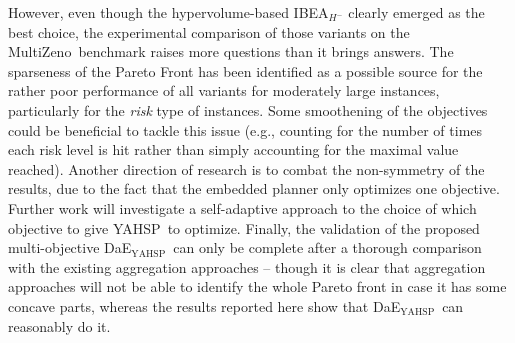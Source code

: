 \documentclass{llncs}
\newcommand{\DAEYAHSP}{{\sc DaE$_{\text{YAHSP}}$}}
\def\YAHSP{{\sc YAHSP}}
\def\MULTIZENO{{\sc MultiZeno}}
\begin{document}
However, even though the hypervolume-based IBEA$_{H^-}$ clearly emerged as the best choice, the experimental comparison of those variants on the  \MULTIZENO\ benchmark raises more questions than it brings answers. The sparseness of the Pareto Front has been identified as a possible source for the rather poor performance of all variants for moderately large instances, particularly for the {\em risk} type of instances. Some smoothening of the objectives could be beneficial to tackle this issue (e.g., counting for the number of times each risk level is hit rather than simply accounting for the maximal value reached). Another direction of research is to combat the non-symmetry of the results, due to the fact that the embedded planner only optimizes one objective. Further work will investigate a self-adaptive approach to the choice of which objective to give \YAHSP\ to optimize. Finally, the validation of the proposed multi-objective \DAEYAHSP\ can only be complete after a thorough comparison with the existing 
aggregation approaches -- though it is clear that aggregation approaches will not be able to identify the whole Pareto front in case it has some concave parts, whereas the results reported here show that \DAEYAHSP\ can reasonably do it.


{\small


}
\end{document}
